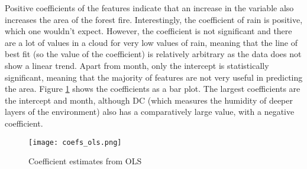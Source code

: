\documentclass{article}
\begin{document}
\begin{table}[!htbp]
\centering
\caption{Coefficients from the OLS model trained on standardized data}
\label{tab:olscoef}
\end{table}

Positive coefficients of the features indicate that an increase in the variable also increases the area of the forest fire. Interestingly, the coefficient of rain is positive, which one wouldn't expect. However, the coefficient is not significant and there are a lot of values in a cloud for very low values of rain, meaning that the line of best fit (so the value of the coefficient) is relatively arbitrary as the data does not show a linear trend. Apart from month, only the intercept is statistically significant, meaning that the majority of features are not very useful in predicting the area. Figure \ref{fig:coefs_ols} shows the coefficients as a bar plot. The largest coefficients are the intercept and month, although DC (which measures the humidity of deeper layers of the environment) also has a comparatively large value, with a negative coefficient.

\begin{figure}[!htbp]
    \centering
    \texttt{[image: coefs\_ols.png]}
    \caption{Coefficient estimates from OLS}
    \label{fig:coefs_ols}
\end{figure}
\end{document}
